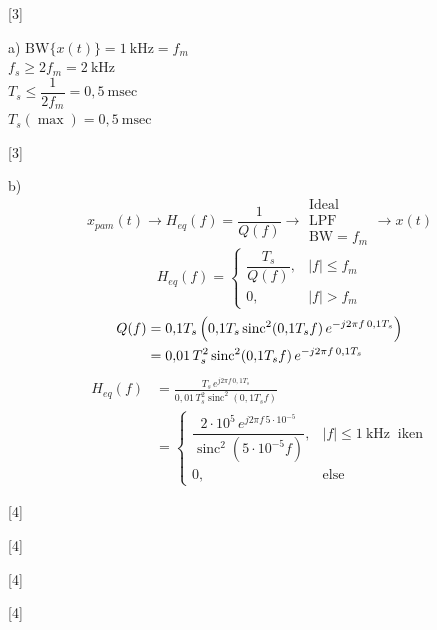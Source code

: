 \documentclass[11pt,a4paper]{article}
\begin{document}
\begin{cozum}
[3]

a) $\mathrm{BW}\{x(t)\} = 1\ \mathrm{kHz} = f_m$\\
\hspace*{1.2em}$f_s \ge 2f_m = 2\ \mathrm{kHz}$\\
\hspace*{1.2em}$T_s \le \dfrac{1}{2f_m} = 0{,}5\ \mathrm{msec}$\\
\hspace*{1.2em}$T_s(\max) = 0{,}5\ \mathrm{msec}$

[3]

b)
\[ x_{pam}(t) \longrightarrow \boxed{H_{eq}(f)=\frac{1}{Q(f)}} \longrightarrow \boxed{\begin{matrix}\text{Ideal}\\ \text{LPF}\\ \mathrm{BW}=f_m\end{matrix}} \longrightarrow x(t) \]
\[ H_{eq}(f) = \begin{cases} \dfrac{T_s}{Q(f)}, & |f| \le f_m\\[1ex] 0, & |f| > f_m \end{cases} \]
\begin{align*}
Q(f) &= 0{,}1T_s\,\Bigl(0{,}1T_s\operatorname{sinc}^2(0{,}1T_s f)\, e^{-j2\pi f\, 0{,}1T_s}\Bigr)\\
&= 0{,}01\,T_s^2\operatorname{sinc}^2(0{,}1T_s f)\, e^{-j2\pi f\, 0{,}1T_s}
\end{align*}
\begin{align*}
H_{eq}(f) &= \frac{T_s\, e^{j2\pi f\, 0{,}1T_s}}{0{,}01\,T_s^2\operatorname{sinc}^2(0{,}1T_s f)}\\
&= \begin{cases} \dfrac{2\cdot 10^{5}\, e^{j2\pi f\, 5\cdot 10^{-5}}}{\operatorname{sinc}^2(5\cdot 10^{-5} f)}, & |f| \le 1\ \mathrm{kHz}\ \text{ iken}\\[2ex] 0, & \text{else} \end{cases}
\end{align*}
\end{cozum}

[4]

[4]

[4]

[4]
\end{document}
